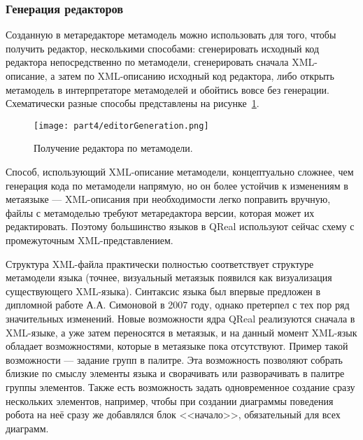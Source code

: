 \subsubsection{Генерация редакторов}
Созданную в метаредакторе метамодель можно использовать для того, чтобы получить редактор, 
несколькими способами: сгенерировать исходный код редактора непосредственно по метамодели, 
сгенерировать сначала XML-описание, а затем по XML-описанию исходный код редактора, 
либо открыть метамодель в интерпретаторе метамоделей и обойтись вовсе без генерации. 
Схематически разные способы представлены на рисунке~\ref{image:editorGeneration}.

\begin{figure} [ht]
	\begin{center}
		\texttt{[image: part4/editorGeneration.png]}
		\caption{Получение редактора по метамодели.}
		\label{image:editorGeneration}
	\end{center}
\end{figure}

Способ, использующий XML-описание метамодели, концептуально сложнее, чем генерация кода
по метамодели напрямую, но он более устойчив к изменениям в метаязыке --- XML-описания
при необходимости легко поправить вручную, файлы с метамоделью требуют метаредактора
версии, которая может их редактировать. Поэтому большинство языков в QReal используют
сейчас схему с промежуточным XML-представлением.

Структура XML-файла практически полностью соответствует структуре метамодели языка 
(точнее, визуальный метаязык появился как визуализация существующего XML-языка). 
Синтаксис языка был впервые предложен в дипломной работе А.А. Симоновой в 2007 году, 
однако претерпел с тех пор ряд значительных изменений. Новые возможности ядра QReal 
реализуются сначала в XML-языке, а уже затем переносятся в метаязык, и на данный момент 
XML-язык обладает возможностями, которые в метаязыке пока отсутствуют. Пример такой 
возможности --- задание групп в палитре. Эта возможность позволяют собрать близкие 
по смыслу элементы языка и сворачивать или разворачивать в палитре группы элементов. 
Также есть возможность задать одновременное создание сразу нескольких элементов, например, 
чтобы при создании диаграммы поведения робота на неё сразу же добавлялся блок <<начало>>, 
обязательный для всех диаграмм.

